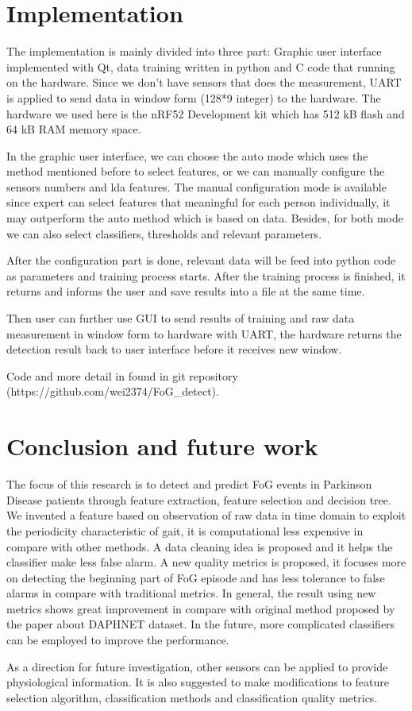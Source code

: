 \documentclass[article]{article}
\begin{document}
\section{Implementation}
   The implementation is mainly divided into three part: Graphic user interface implemented with Qt, data training written in python and C code that running on the hardware. Since we don't have sensors that does the measurement, UART is applied to send data in window form (128*9 integer) to the hardware. The hardware we used here is the nRF52 Development kit which has 512 kB flash and 64 kB RAM memory space.  
        
   
   In the graphic user interface, we can choose the auto mode which uses the method mentioned before to select features, or we can manually configure the sensors numbers and lda features. The manual configuration mode is available since expert can select features that meaningful for each person individually, it may outperform the auto method which is based on data. Besides, for both mode we can also select classifiers, thresholds and relevant parameters. 
   
   After the configuration part is done, relevant data will be feed into python code as parameters and training process starts. After the training process is finished, it returns and informs the user and save results into a file at the same time. 
   
   Then user can further use GUI to send results of training and raw data measurement in window form to hardware with UART, the hardware returns the detection result back to user interface before it receives new window.
   
	Code and more detail in found in git repository (https://github.com/wei2374/FoG\_detect).
   
  
\section{Conclusion and future work}
The focus of this research is to detect and predict FoG events in Parkinson Disease patients through feature extraction, feature selection and decision tree.
We invented a feature based on observation of raw data in time domain to exploit the periodicity characteristic of gait, it is computational less expensive in compare with other methods. A data cleaning idea is proposed and it helps the classifier make less false alarm. A new quality metrics is proposed, it focuses more on detecting the beginning part of FoG episode and has less tolerance to false alarms in compare with traditional metrics. In general, the result using new metrics shows great improvement in compare with original method proposed by the paper about DAPHNET dataset. In the future, more complicated classifiers can be employed to improve the performance.

As a direction for future investigation, other sensors can be applied to provide physiological information. It is also suggested to make modifications to feature selection algorithm, classification methods and classification quality metrics.  

    



\nocite{*}
		
\end{document}
